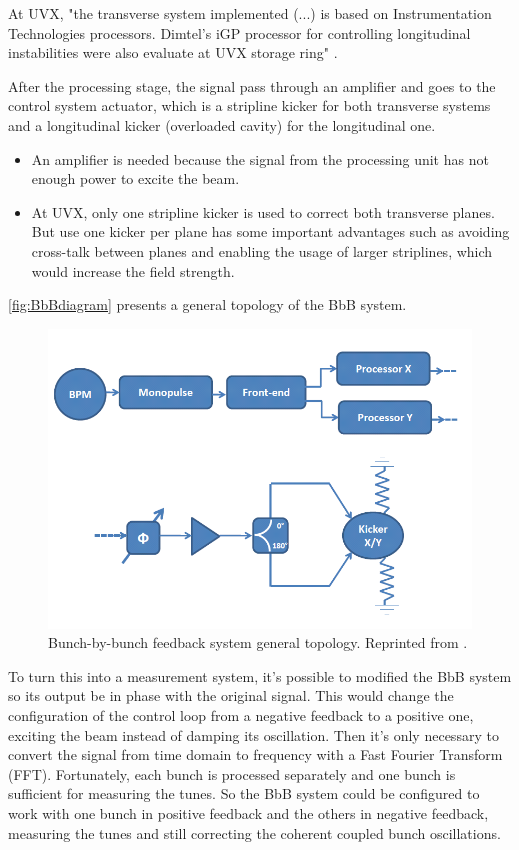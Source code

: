 At UVX, "the transverse system implemented (...) is based on Instrumentation Technologies processors. Dimtel's iGP processor for controlling longitudinal instabilities were also evaluate at UVX storage ring" \cite{digFeedback}.

After the processing stage, the signal pass through an amplifier and goes to the control system actuator, which is a stripline kicker for both transverse systems and a longitudinal kicker (overloaded cavity) for the longitudinal one.

\begin{itemize}
	\item An amplifier is needed because the signal from the processing unit has not enough power to excite the beam.
	\item At UVX, only one stripline kicker is used to correct both transverse planes. But use one kicker per plane has some important advantages such as avoiding cross-talk between planes and enabling the usage of larger striplines, which would increase the field strength.
\end{itemize}

\autoref{fig:BbBdiagram} presents a general topology of the BbB system.

\begin{figure}[!htb]
	\centering
	\includegraphics[width=0.8\linewidth]{./Figures/BbBdiagram.png}
	\caption{Bunch-by-bunch feedback system general topology. Reprinted from \cite{digFeedback}.}
	\label{fig:BbBdiagram}
\end{figure}

To turn this into a measurement system, it's possible to modified the BbB system so its output be in phase with the original signal. This would change the configuration of the control loop from a negative feedback to a positive one, exciting the beam instead of damping its oscillation. Then it's only necessary to convert the signal from time domain to frequency with a Fast Fourier Transform (FFT). Fortunately, each bunch is processed separately and one bunch is sufficient for measuring the tunes. So the BbB system could be configured to work with one bunch in positive feedback and the others in negative feedback, measuring the tunes and still correcting the coherent coupled bunch oscillations.

